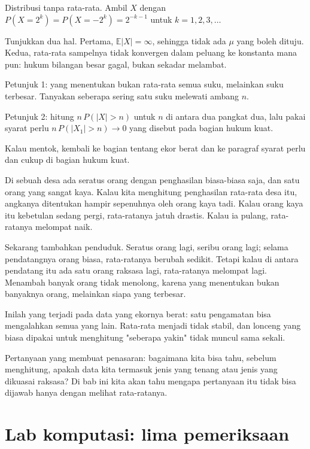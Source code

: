 \begin{tantangan}
Distribusi tanpa rata-rata. Ambil $X$ dengan
$P(X=2^k)=P(X=-2^k)=2^{-k-1}$ untuk $k=1,2,3,\dots$

Tunjukkan dua hal. Pertama, $\mathbb{E}|X|=\infty$, sehingga tidak ada $\mu$
yang boleh dituju. Kedua, rata-rata sampelnya tidak konvergen dalam peluang ke
konstanta mana pun: hukum bilangan besar gagal, bukan sekadar melambat.

Petunjuk 1: yang menentukan bukan rata-rata semua suku, melainkan suku
terbesar. Tanyakan seberapa sering satu suku melewati ambang $n$.

Petunjuk 2: hitung $n\,P(|X|>n)$ untuk $n$ di antara dua pangkat dua, lalu
pakai syarat perlu $n\,P(|X_1|>n)\to0$ yang disebut pada bagian hukum kuat.

Kalau mentok, kembali ke bagian tentang ekor berat dan ke paragraf syarat perlu
dan cukup di bagian hukum kuat.
\end{tantangan}

\begin{untukanak}
Di sebuah desa ada seratus orang dengan penghasilan biasa-biasa saja, dan satu
orang yang sangat kaya. Kalau kita menghitung penghasilan rata-rata desa itu,
angkanya ditentukan hampir sepenuhnya oleh orang kaya tadi. Kalau orang kaya itu
kebetulan sedang pergi, rata-ratanya jatuh drastis. Kalau ia pulang, rata-ratanya
melompat naik.

Sekarang tambahkan penduduk. Seratus orang lagi, seribu orang lagi; selama
pendatangnya orang biasa, rata-ratanya berubah sedikit. Tetapi kalau di antara
pendatang itu ada satu orang raksasa lagi, rata-ratanya melompat lagi. Menambah
banyak orang tidak menolong, karena yang menentukan bukan banyaknya orang,
melainkan siapa yang terbesar.

Inilah yang terjadi pada data yang ekornya berat: satu pengamatan bisa
mengalahkan semua yang lain. Rata-rata menjadi tidak stabil, dan lonceng yang
biasa dipakai untuk menghitung "seberapa yakin" tidak muncul sama sekali.

Pertanyaan yang membuat penasaran: bagaimana kita bisa tahu, sebelum menghitung,
apakah data kita termasuk jenis yang tenang atau jenis yang dikuasai raksasa? Di
bab ini kita akan tahu mengapa pertanyaan itu tidak bisa dijawab hanya dengan
melihat rata-ratanya.
\end{untukanak}

\section{Lab komputasi: lima pemeriksaan}

